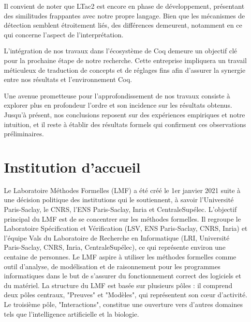 \documentclass[titlepage]{article}
\begin{document}
Il convient de noter que LTac2 est encore en phase de développement, présentant des similitudes frappantes avec notre propre langage. Bien que les mécanismes de détection semblent étroitement liés, des différences demeurent, notamment en ce qui concerne l'aspect de l'interprétation.

L'intégration de nos travaux dans l'écosystème de Coq demeure un objectif clé pour la prochaine étape de notre recherche. Cette entreprise impliquera un travail méticuleux de traduction de concepts et de réglages fins afin d'assurer la synergie entre nos résultats et l'environnement Coq.

Une avenue prometteuse pour l'approfondissement de nos travaux consiste à explorer plus en profondeur l'ordre et son incidence sur les résultats obtenus. Jusqu'à présent, nos conclusions reposent sur des expériences empiriques et notre intuition, et il reste à établir des résultats formels qui confirment ces observations préliminaires.



\newpage
\appendix
\section{Institution d'accueil}
Le Laboratoire Méthodes Formelles (LMF) a été créé le 1er janvier 2021 suite à une décision politique des institutions qui le soutiennent, à savoir l'Université Paris-Saclay, le CNRS, l'ENS Paris-Saclay, Inria et CentraleSupélec. L'objectif principal du LMF est de se concentrer sur les méthodes formelles. Il regroupe le Laboratoire Spécification et Vérification (LSV, ENS Paris-Saclay, CNRS, Inria) et l'équipe Vals du Laboratoire de Recherche en Informatique (LRI, Université Paris-Saclay, CNRS, Inria, CentraleSupélec), ce qui représente environ une centaine de personnes.
Le LMF aspire à utiliser les méthodes formelles comme outil d'analyse, de modélisation et de raisonnement pour les programmes informatiques dans le but de s'assurer du fonctionnement correct des logiciels et du matériel.
La structure du LMF est basée sur plusieurs pôles : il comprend deux pôles centraux, "Preuves" et "Modèles", qui représentent son cœur d'activité. Le troisième pôle, "Interactions", constitue une ouverture vers d'autres domaines tels que l'intelligence artificielle et la biologie.



\end{document}
